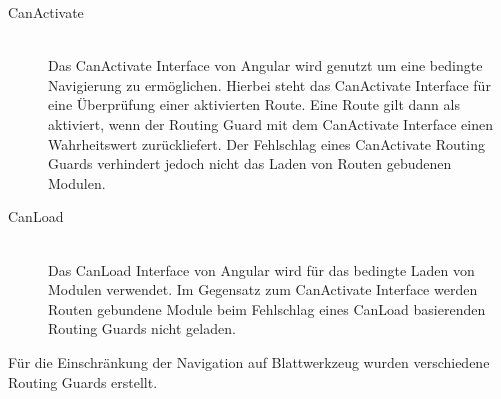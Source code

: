 \begin{description}
	\item[CanActivate]\hfill\\
	Das CanActivate Interface von Angular wird genutzt um eine bedingte Navigierung zu ermöglichen. Hierbei steht das CanActivate Interface für eine Überprüfung einer aktivierten Route. Eine Route gilt dann als aktiviert, wenn der Routing Guard mit dem CanActivate Interface einen Wahrheitswert zurückliefert. Der Fehlschlag eines CanActivate Routing Guards verhindert jedoch nicht das Laden von Routen gebudenen Modulen.
	\item[CanLoad]\hfill\\
	Das CanLoad Interface von Angular wird für das bedingte Laden von Modulen verwendet. Im Gegensatz zum CanActivate Interface werden Routen gebundene Module beim Fehlschlag eines CanLoad basierenden Routing Guards nicht geladen.
\end{description}

Für die Einschränkung der Navigation auf Blattwerkzeug wurden verschiedene Routing Guards erstellt.

